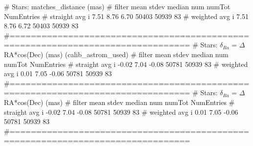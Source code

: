 \begin{code}
# Stars: matches_distance (mas)
#                filter    mean    stdev    median     num      numTot  NumEntries
# straight avg       i     7.51     8.76     6.70     50403     50939        83
# weighted avg       i     7.51     8.76     6.72     50403     50939        83
#================================================================================
# Stars:  $\delta_{Ra}$ = $\Delta$RA*cos(Dec) (mas) (calib_astrom_used)
#                filter    mean    stdev    median     num      numTot  NumEntries
# straight avg       i    -0.02     7.04    -0.08     50781     50939        83
# weighted avg       i     0.01     7.05    -0.06     50781     50939        83
#================================================================================
# Stars: $\delta_{Ra}$ = $\Delta$RA*cos(Dec) (mas)
#                filter    mean    stdev    median     num      numTot  NumEntries
# straight avg       i    -0.02     7.04    -0.08     50781     50939        83
# weighted avg       i     0.01     7.05    -0.06     50781     50939        83
#================================================================================
\end{code}
